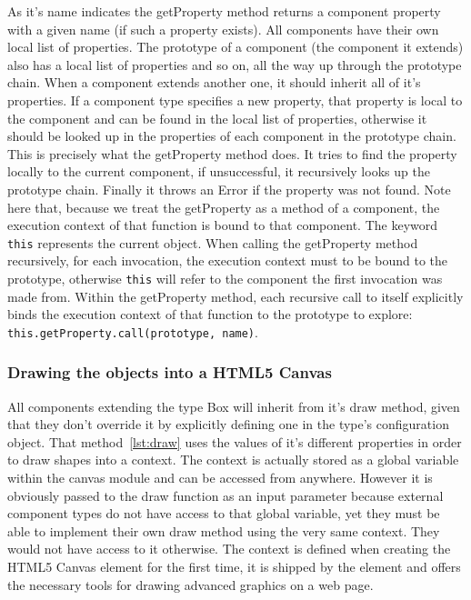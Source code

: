 As it's name indicates the getProperty method returns a component property with a given name (if such a property exists). All components have their own local list of properties. The prototype of a component (the component it extends) also has a local list of properties and so on, all the way up through the prototype chain. When a component extends another one, it should inherit all of it's properties. If a component type specifies a new property, that property is local to the component and can be found in the local list of properties, otherwise it should be looked up in the properties of each component in the prototype chain. This is precisely what the getProperty method does. It tries to find the property locally to the current component, if unsuccessful, it recursively looks up the prototype chain. Finally it throws an Error if the property was not found. Note here that, because we treat the getProperty as a method of a component, the execution context of that function is bound to that component. The keyword \texttt{this} represents the current object. When calling the getProperty method recursively, for each invocation, the execution context must to be bound to the prototype, otherwise \texttt{this} will refer to the component the first invocation was made from. Within the getProperty method, each recursive call to itself explicitly binds the execution context of that function to the prototype to explore: \texttt{this.getProperty.call(prototype, name)}.

\subsubsection{Drawing the objects into a HTML5 Canvas}



All components extending the type Box will inherit from it's draw method, given that they don't override it by explicitly defining one in the type's configuration object. That method~\ref{lst:draw} uses the values of it's different properties in order to draw shapes into a context. The context is actually stored as a global variable within the canvas module and can be accessed from anywhere. However it is obviously passed to the draw function as an input parameter because external component types do not have access to that global variable, yet they must be able to implement their own draw method using the very same context. They would not have access to it otherwise. The context is defined when creating the HTML5 Canvas element for the first time, it is shipped by the element and offers the necessary tools for drawing advanced graphics on a web page.

